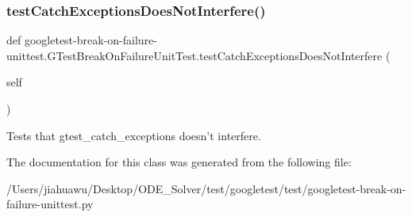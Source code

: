 \subsubsection{\texorpdfstring{test\+Catch\+Exceptions\+Does\+Not\+Interfere()}{testCatchExceptionsDoesNotInterfere()}}
{\footnotesize\ttfamily def googletest-\/break-\/on-\/failure-\/unittest.\+G\+Test\+Break\+On\+Failure\+Unit\+Test.\+test\+Catch\+Exceptions\+Does\+Not\+Interfere (\begin{DoxyParamCaption}\item[{}]{self }\end{DoxyParamCaption})}

\begin{DoxyVerb}Tests that gtest_catch_exceptions doesn't interfere.\end{DoxyVerb}
 

The documentation for this class was generated from the following file\+:\begin{DoxyCompactItemize}
\item 
/\+Users/jiahuawu/\+Desktop/\+O\+D\+E\+\_\+\+Solver/test/googletest/test/googletest-\/break-\/on-\/failure-\/unittest.\+py\end{DoxyCompactItemize}
